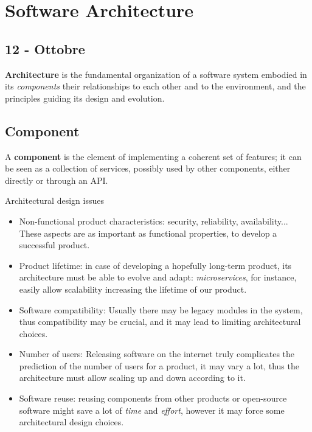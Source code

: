 \chapter{Software Architecture}
\section*{12 - Ottobre}
\textbf{Architecture} is the fundamental organization of a software system embodied in its \textit{components} their relationships to each other and to the environment,
and the principles guiding its design and evolution.

\section{Component}
A \textbf{component} is the element of implementing a coherent set of features;
it can be seen as a collection of services,
possibly used by other components, 
either directly or through an API.


Architectural design issues
\begin{itemize}
    \item Non-functional product characteristics: security, reliability, availability...
    These aspects are as important as functional properties, to develop a successful product.
    \item Product lifetime:
    in case of developing a hopefully long-term product,
    its architecture must be able to evolve and adapt:
    \textit{microservices}, for instance, easily allow scalability increasing the lifetime of our product.
    \item Software compatibility:
    Usually there may be legacy modules in the system,
    thus compatibility may be crucial,
    and it may lead to limiting architectural choices.
    \item Number of users:
    Releasing software on the internet truly complicates the prediction of the number of users for a product,
    it may vary a lot,
    thus the architecture must allow scaling up and down according to it.
    \item Software reuse:
    reusing components from other products or open-source software might save a lot of \textit{time} and \textit{effort},
    however it may force some architectural design choices.
\end{itemize}

